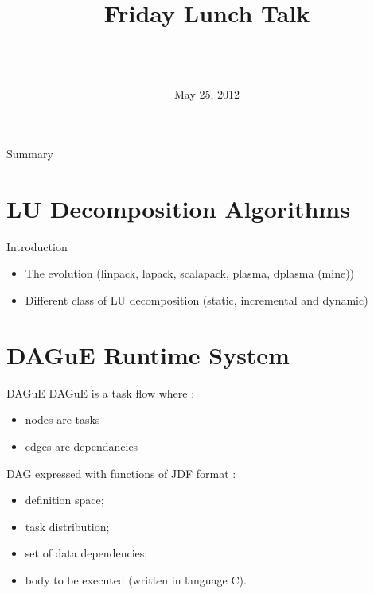 \documentclass{beamer}
\title[LU Decompositions over DAGuE]{
        {\bfseries \projet\\} 
        {\bfseries \huge \sujet}
        {\small Friday Lunch Talk}
}
\date{May 25, 2012}
\author[Zenati]{
  {\normalsize \bfseries \sffamily} {\large \gA}\\
  \vspace{1cm}
  {\normalsize \bfseries \sffamily} {\large \gB}\\
}
\begin{document}
        
\begin{frame}
\maketitle
\end{frame}

\begin{frame}{Summary}
\tableofcontents
\end{frame}



\section{LU Decomposition Algorithms}
\begin{frame}{Introduction}
\begin{itemize}
\item The evolution (linpack, lapack, scalapack, plasma, dplasma (mine))
\item Different class of LU decomposition (static, incremental and dynamic)
\end{itemize}
\end{frame}

\section{DAGuE Runtime System}
\begin{frame}{DAGuE}
DAGuE is a task flow where :
\begin{itemize}
\item nodes are tasks
\item edges are dependancies
\end{itemize}
\pause
DAG expressed with functions of JDF format :
\begin{itemize}
\item definition space;
\item task distribution;
\item set of data dependencies;
\item body to be executed (written in language C).
\end{itemize}
\end{frame}
\end{document}
